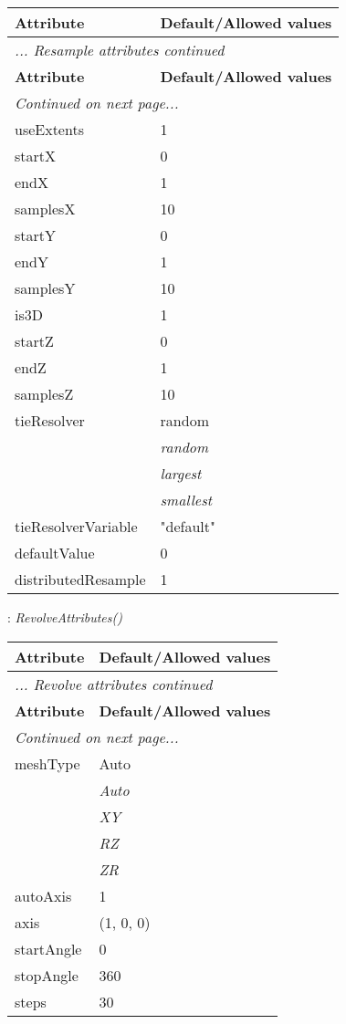 \documentclass[10pt,a4paper]{report}
\begin{document}
\begin{longtable}{ll}
{\bf Attribute} & {\bf Default/Allowed values} \\
\hline \hline
\endfirsthead
\multicolumn{2}{l}{{\it ... Resample attributes continued}} \\
{\bf Attribute} & {\bf Default/Allowed values} \\
\hline \hline
\endhead
\hline
\multicolumn{2}{l}{{\it Continued on next page...}} \\
\endfoot
\hline
\endlastfoot

useExtents  &  1 \\
startX  &  0 \\
endX  &  1 \\
samplesX  &  10 \\
startY  &  0 \\
endY  &  1 \\
samplesY  &  10 \\
is3D  &  1 \\
startZ  &  0 \\
endZ  &  1 \\
samplesZ  &  10 \\
tieResolver  &  random   \\
 & {\it  random} \\
 & {\it  largest} \\
 & {\it  smallest} \\
tieResolverVariable  &  "default" \\
defaultValue  &  0 \\
distributedResample  &  1 \\
\end{longtable}

\newpage

{}
: {\it RevolveAttributes() }\\[-3mm]

\begin{longtable}{ll}
{\bf Attribute} & {\bf Default/Allowed values} \\
\hline \hline
\endfirsthead
\multicolumn{2}{l}{{\it ... Revolve attributes continued}} \\
{\bf Attribute} & {\bf Default/Allowed values} \\
\hline \hline
\endhead
\hline
\multicolumn{2}{l}{{\it Continued on next page...}} \\
\endfoot
\hline
\endlastfoot

meshType  &  Auto   \\
 & {\it  Auto} \\
 & {\it  XY} \\
 & {\it  RZ} \\
 & {\it  ZR} \\
autoAxis  &  1 \\
axis  &  (1, 0, 0) \\
startAngle  &  0 \\
stopAngle  &  360 \\
steps  &  30 \\
\end{longtable}
\end{document}
